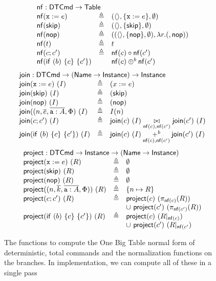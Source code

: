 \begin{figure}[tp]
  \[
    \begin{array}{l c l}
      \multicolumn 3 l {\nf : \DTCmd \to \Table}\\
      \nf(\var x := e)
      &\triangleq
      &(\langle\rangle, \{\var x:=e\}, \emptyset) \\
      \nf(\SKIP)
      &\triangleq
      & (\langle\rangle, \{\SKIP\}, \emptyset) \\
      \nf(\nop)
      &\triangleq
      & ((\langle\rangle, \{\nop\}, \emptyset), \lambda r. (,\nop)) \\
      \nf(t)
      &\triangleq
      & t \\
      \nf(c;c')
      &\triangleq
      & \nf(c) \circ \nf(c') \\
      \nf (\ifte b c {c'})
      && \nf(c) \oplus^b \nf(c')
    \end{array}\]
  \[\begin{array}{lcl}
      \multicolumn 3 l {\join : \DTCmd \to (\Name \to \Instance) \to \Instance}\\
      \join(\var x := e)~(I)
      &\triangleq
      & (x:=e) \\
      \join(\SKIP)~(I)
      &\triangleq
      & (\SKIP) \\
      \join(\nop)~(I)
      & \triangleq
      & (\nop)\\
      \join((n, \vec{e}, \vec{\var a : A}, \Phi)~(I)
      &\triangleq
      & I(n)\\
      \join(c;c')~(I)
      &\triangleq
      & \join(c)~(I) \underset{\nf(c),\nf(c')}{\bowtie} \join(c')~(I)\\
      \join(\ifte b c {c'})~(I)
      &\triangleq 
      & \join(c)~(I) \underset{{\nf(c),\nf(c')}}{+^b}\join(c')~(I)
    \end{array}\]
  \[\begin{array}{lcl}        
      \multicolumn 3 l {\project : \DTCmd \to \Instance \to (\Name \to \Instance)}\\
      \project(\var x := e)~(R)
      &\triangleq
      & \emptyset \\
      \project(\SKIP)~(R)
      &\triangleq
      & \emptyset \\
      \project(\nop)~(R)
      & \triangleq
      & \emptyset \\
      \project((n,\vec{k}, \vec{ \var a : A}, \Phi))~(R)
      &\triangleq
      & \{n \mapsto R\}\\
      \project(c;c')~(R)
      &\triangleq
      & \project(c)~(\pi_{\nf(c)}(R)) \\
      && \cup~\project(c')~(\pi_{\nf(c')}(R))\\
      \project(\ifte b c {c'})~(R)
      &\triangleq 
      & \project(c)~(R|_{\nf(c)}) \\
      && \cup~\project(c')~(R|_{\nf(c'})
    \end{array}
  \]
  \caption{The functions to compute the One Big Table normal form of
    deterministic, total commands and the normalization functions on
    the branches. In implementation, we can compute all of these in
    a single pass}
  \label{fig:normal-form}
\end{figure}